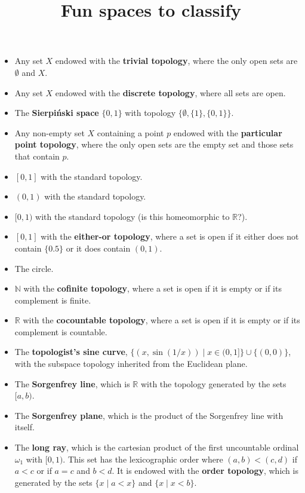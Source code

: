 \documentclass[12pt]{article}
\title{Fun spaces to classify}
\author{}
\date{}
\newcommand{\R}{\mathbb{R}}
\newcommand{\N}{\mathbb{N}}
\begin{document}

\maketitle

\vspace{-6ex}

\begin{itemize}
\item Any set $X$ endowed with the \textbf{trivial topology}, where the only open sets are $\emptyset$ and $X$.
\item Any set $X$ endowed with the \textbf{discrete topology}, where all sets are open.
\item The \textbf{Sierpi\'{n}ski space} $\{0,1\}$ with topology $\{\emptyset, \{1\}, \{0,1\}\}$.
\item Any non-empty set $X$ containing a point $p$ endowed with the \textbf{particular point topology}, where the only open sets are the empty set and those sets that contain $p$.
\item $[0,1]$ with the standard topology.
\item $(0,1)$ with the standard topology.
\item $[0,1)$ with the standard topology (is this homeomorphic to $\R$?).
\item $[0,1]$ with the \textbf{either-or topology}, where a set is open if it either does not contain $\{0.5\}$ or it does contain $(0,1)$.
\item The circle.
\item $\N$ with the \textbf{cofinite topology}, where a set is open if it is empty or if its complement is finite.
\item $\R$ with the \textbf{cocountable topology}, where a set is open if it is empty or if its complement is countable.
\item The \textbf{topologist's sine curve}, $\{(x, \sin (1/x)) \mid x \in (0,1]\} \cup \{(0,0)\}$, with the subspace topology inherited from the Euclidean plane.
\item The \textbf{Sorgenfrey line}, which is $\R$ with the topology generated by the sets $[a,b)$.
\item The \textbf{Sorgenfrey plane}, which is the product of the Sorgenfrey line with itself.
\item The \textbf{long ray}, which is the cartesian product of the first uncountable ordinal $\omega_1$ with $[0,1)$. This set has the lexicographic order where $(a,b) < (c,d)$ if $a < c$ or if $a = c$ and $b < d$. It is endowed with the \textbf{order topology}, which is generated by the sets $\{x \mid a < x \}$ and $\{x \mid x < b\}$.

\end{itemize}
\end{document}
